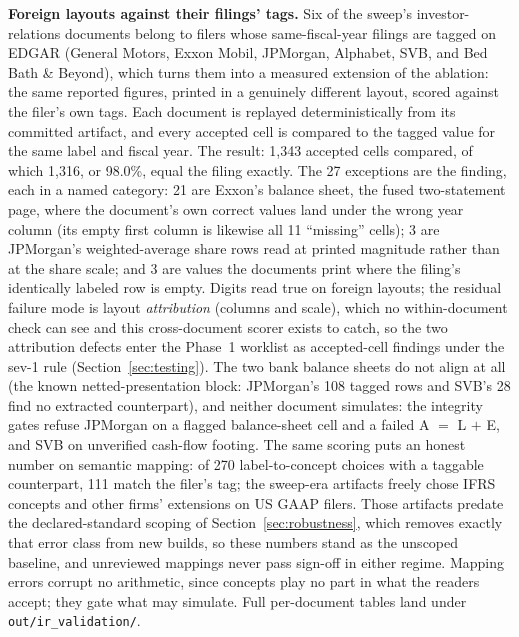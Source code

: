 \documentclass[11pt]{article}
\newcommand{\lead}[2]{\par\addvspace{5pt}\textbf{\textcolor{#1}{#2}}}
\begin{document}
\lead{navytwo}{Foreign layouts against their filings' tags.} Six of the sweep's investor-relations documents belong to filers whose same-fiscal-year filings are tagged on EDGAR (General Motors, Exxon Mobil, JPMorgan, Alphabet, SVB, and Bed Bath \& Beyond), which turns them into a measured extension of the ablation: the same reported figures, printed in a genuinely different layout, scored against the filer's own tags. Each document is replayed deterministically from its committed artifact, and every accepted cell is compared to the tagged value for the same label and fiscal year. The result: 1{,}343 accepted cells compared, of which 1{,}316, or 98.0\%, equal the filing exactly. The 27 exceptions are the finding, each in a named category: 21 are Exxon's balance sheet, the fused two-statement page, where the document's own correct values land under the wrong year column (its empty first column is likewise all 11 ``missing'' cells); 3 are JPMorgan's weighted-average share rows read at printed magnitude rather than at the share scale; and 3 are values the documents print where the filing's identically labeled row is empty. Digits read true on foreign layouts; the residual failure mode is layout \emph{attribution} (columns and scale), which no within-document check can see and this cross-document scorer exists to catch, so the two attribution defects enter the Phase~1 worklist as accepted-cell findings under the sev-1 rule (Section~\ref{sec:testing}). The two bank balance sheets do not align at all (the known netted-presentation block: JPMorgan's 108 tagged rows and SVB's 28 find no extracted counterpart), and neither document simulates: the integrity gates refuse JPMorgan on a flagged balance-sheet cell and a failed A $=$ L $+$ E, and SVB on unverified cash-flow footing. The same scoring puts an honest number on semantic mapping: of 270 label-to-concept choices with a taggable counterpart, 111 match the filer's tag; the sweep-era artifacts freely chose IFRS concepts and other firms' extensions on US GAAP filers. Those artifacts predate the declared-standard scoping of Section~\ref{sec:robustness}, which removes exactly that error class from new builds, so these numbers stand as the unscoped baseline, and unreviewed mappings never pass sign-off in either regime. Mapping errors corrupt no arithmetic, since concepts play no part in what the readers accept; they gate what may simulate. Full per-document tables land under \texttt{out/ir\_validation/}.
\end{document}
